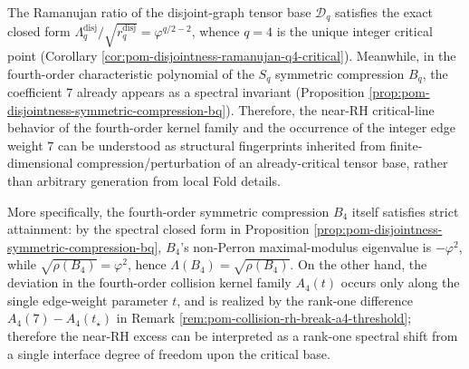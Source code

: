 \begin{remark}\label{rem:pom-q4-disjointness-base-critical}
The Ramanujan ratio of the disjoint-graph tensor base \(\mathcal{D}_q\) satisfies the exact closed form
\(
\Lambda_q^{\mathrm{disj}}/\sqrt{r_q^{\mathrm{disj}}}=\varphi^{q/2-2}
\), whence \(q=4\) is the unique integer critical point (Corollary \ref{cor:pom-disjointness-ramanujan-q4-critical}).
Meanwhile, in the fourth-order characteristic polynomial of the \(S_q\) symmetric compression \(B_q\), the coefficient \(7\) already appears as a spectral invariant (Proposition \ref{prop:pom-disjointness-symmetric-compression-bq}).
Therefore, the near-RH critical-line behavior of the fourth-order kernel family and the occurrence of the integer edge weight \(7\) can be understood as structural fingerprints inherited from finite-dimensional compression/perturbation of an already-critical tensor base, rather than arbitrary generation from local Fold details.
\par
More specifically, the fourth-order symmetric compression \(B_4\) itself satisfies strict attainment: by the spectral closed form in Proposition \ref{prop:pom-disjointness-symmetric-compression-bq}, \(B_4\)'s non-Perron maximal-modulus eigenvalue is \(-\varphi^2\), while \(\sqrt{\rho(B_4)}=\varphi^2\), hence \(\Lambda(B_4)=\sqrt{\rho(B_4)}\).
On the other hand, the deviation in the fourth-order collision kernel family \(A_4(t)\) occurs only along the single edge-weight parameter \(t\), and is realized by the rank-one difference \(A_4(7)-A_4(t_\star)\) in Remark \ref{rem:pom-collision-rh-break-a4-threshold};
therefore the near-RH excess can be interpreted as a rank-one spectral shift from a single interface degree of freedom upon the critical base.
\end{remark}

